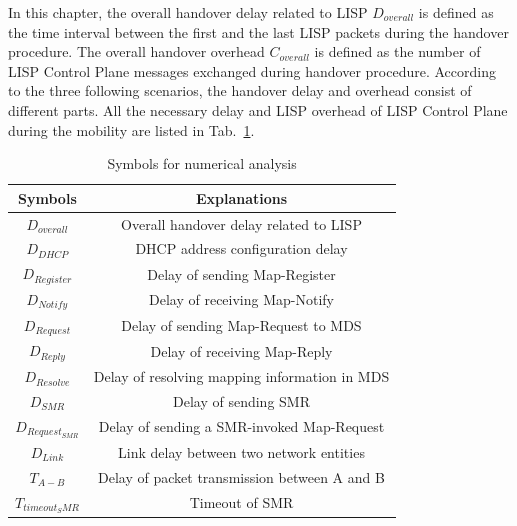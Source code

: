 In this chapter, the overall handover delay related to LISP $D_{overall}$ is defined as the time interval between the first and the last LISP packets during the handover procedure. %
The overall handover overhead $C_{overall}$ is defined as the number of LISP Control Plane messages exchanged during handover procedure.
According to the three following scenarios, the handover delay and overhead consist of different parts. All the necessary delay and LISP overhead of LISP Control Plane during the mobility are listed in Tab.~\ref{Symbols_numerical_analysis}.
\begin{table}[!tb]
	\centering
	\caption{Symbols for numerical analysis}
	\label{Symbols_numerical_analysis}{
		\begin{tabular}{@{}|c|c|@{}}
			\hline\hline
			Symbols & Explanations   \\ \hline
			$D_{overall}$ & Overall handover delay related to LISP	\\  \hline    
			$D_{DHCP}$ &  DHCP address configuration delay \\  \hline    
			$D_{Register}$ &  Delay of sending Map-Register      	\\  \hline
			$D_{Notify}$ &  Delay of receiving Map-Notify      	\\  \hline           
			$D_{Request}$ &  Delay of sending Map-Request to MDS      	\\  \hline   
			$D_{Reply}$ &  Delay of receiving Map-Reply      	\\  \hline      
			$D_{Resolve}$ &  Delay of resolving mapping information in MDS      	\\  \hline               
			$D_{SMR}$ &  Delay of sending SMR       	\\  \hline 
			$D_{Request_{SMR}}$ &  Delay of sending a SMR-invoked Map-Request \\  \hline 
			$D_{Link}$ &  Link delay between two network entities \\  \hline 
			$T_{A-B}$ &  Delay of packet transmission between A and B     	\\  \hline
			$T_{timeout_SMR}$ &  Timeout of SMR \\  \hline  \hline    
		\end{tabular}
	}
\end{table}



